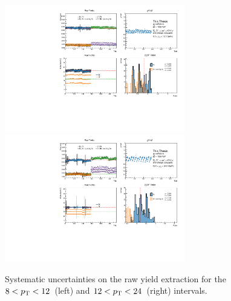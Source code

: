 \begin{figure}
    \centering
    \includegraphics[width=0.7\textwidth]{Figures/Chapter 5/AllPtBins/RawYieldSyst8_12.pdf}
    \includegraphics[width=0.7\textwidth]{Figures/Chapter 5/AllPtBins/RawYieldSyst12_24.pdf}
    \caption{Systematic uncertainties on the raw yield extraction for the $8 < p_\mathrm{T} < 12$~\gevc (left) and $12 < p_\mathrm{T} < 24$~\gevc (right) intervals.}
\end{figure}
